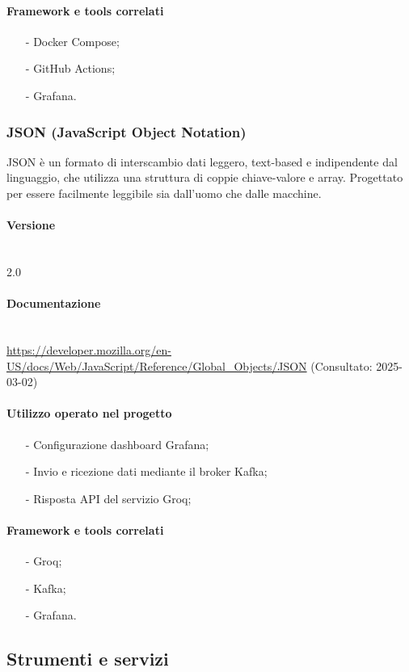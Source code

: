 \documentclass[10pt]{article}
\newcommand{\myparagraph}[1]{\paragraph{#1}\mbox{}\\\vspace{0.4em}}
\begin{document}
\begin{justify}
        \paragraph{Framework e tools correlati}
            \begin{itemize}
                \item[-] Docker Compose;
                \item[-] GitHub Actions;
                \item[-] Grafana.
            \end{itemize}

    \subsubsection{JSON (JavaScript Object Notation)}
    JSON è un formato di interscambio dati leggero, text-based e indipendente dal linguaggio, che utilizza una struttura di coppie 
    chiave-valore e array. Progettato per essere facilmente leggibile sia dall'uomo che dalle macchine.
        \myparagraph{Versione} 
            2.0
        \myparagraph{Documentazione}
        \textcolor{blue}{\url{https://developer.mozilla.org/en-US/docs/Web/JavaScript/Reference/Global_Objects/JSON}} (Consultato: 2025-03-02)
        \paragraph{Utilizzo operato nel progetto}
            \begin{itemize}
                \item[-] Configurazione dashboard Grafana;
                \item[-] Invio e ricezione dati mediante il broker Kafka;
                \item[-] Risposta API del servizio Groq;
            \end{itemize}
        \paragraph{Framework e tools correlati}
            \begin{itemize}
                \item[-] Groq;
                \item[-] Kafka;
                \item[-] Grafana.
            \end{itemize}


\subsection{Strumenti e servizi}
\label{sec:strumenti}


\end{justify}
\end{document}
